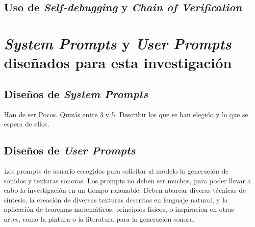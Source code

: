     \section{Uso de \textit{Self-debugging} y \textit{Chain of Verification}}

\chapter{\textit{System Prompts} y \textit{User Prompts} diseñados para esta investigación}
    \section{Diseños de \textit{System Prompts}}
        Han de ser Pocos. Quizás entre 3 y 5. Describir los que se han elegido y lo que se espera de ellos.
    \section{Diseños de \textit{User Prompts}}
        Los prompts de usuario escogidos para solicitar al modelo la generación de sonidos y texturas sonoras. Los prompts no deben ser muchos, para poder llevar a cabo la investigación en un tiempo razonable. Deben abarcar diveras técnicas de síntesis, la creación de diversas texturas descritas en lenguaje natural, y la aplicación de teoremas matemáticos, principios físicos, o inspiracion en otras artes, como la pintura o la literatura para la generación sonora.



